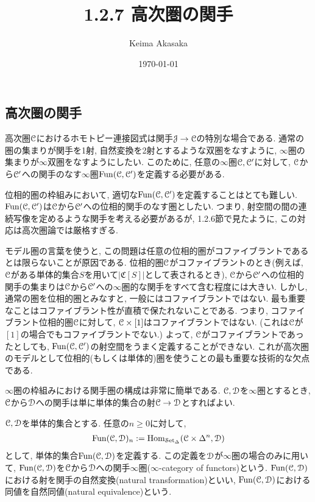 \documentclass[uplatex, a4paper, 14Q, dvipdfmx]{jsreport}
\title{1.2.7 高次圏の関手}
\author{Keima Akasaka}
\date{\today}
\begin{document}

\setcounter{chapter}{1}
\setcounter{section}{2} 
\setcounter{subsection}{6}   
\setcounter{subsubsection}{1}

\subsection{高次圏の関手}

高次圏$\mathcal{C}$におけるホモトピー連接図式は関手$\mathcal{J} \to \mathcal{C}$の特別な場合である. 
通常の圏の集まりが関手を1射, 自然変換を2射とするような双圏をなすように, $\infty$圏の集まりが$\infty$双圏をなすようにしたい. 
このために, 任意の$\infty$圏$\mathcal{C},\mathcal{C}'$に対して, $\mathcal{C}$から$\mathcal{C}'$への関手のなす$\infty$圏$\mathrm{Fun}(\mathcal{C},\mathcal{C}')$を定義する必要がある. 

位相的圏の枠組みにおいて, 適切な$\mathrm{Fun}(\mathcal{C},\mathcal{C}')$を定義することはとても難しい. 
$\mathrm{Fun}(\mathcal{C},\mathcal{C}')$は$\mathcal{C}$から$\mathcal{C}'$への位相的関手のなす圏としたい.
つまり, 射空間の間の連続写像を定めるような関手を考える必要があるが, 1.2.6節で見たように, この対応は高次圏論では厳格すぎる. 

\begin{remark} \label{rem.1.2.7.1}
  モデル圏の言葉を使うと, この問題は任意の位相的圏がコファイブラントであるとは限らないことが原因である.
  位相的圏$\mathcal{C}$がコファイブラントのとき(例えば, $\mathcal{C}$がある単体的集合$S$を用いて$|\mathfrak{C}[S]|$として表されるとき), $\mathcal{C}$から$\mathcal{C}'$への位相的関手の集まりは$\mathcal{C}$から$\mathcal{C}'$への$\infty$圏的な関手をすべて含む程度には大きい.
  しかし, 通常の圏を位相的圏とみなすと, 一般にはコファイブラントではない.
  最も重要なことはコファイブラント性が直積で保たれないことである. 
  つまり, コファイブラント位相的圏$\mathcal{C}$に対して, $\mathcal{C} \times [1]$はコファイブラントではない. (これは$\mathcal{C}$が$[1]$の場合でもコファイブラントでない.)
  よって, $\mathcal{C}$がコファイブラントであったとしても, $\mathrm{Fun}(\mathcal{C},\mathcal{C}')$の射空間をうまく定義することができない.
  これが高次圏のモデルとして位相的(もしくは単体的)圏を使うことの最も重要な技術的な欠点である. 
\end{remark}

$\infty$圏の枠組みにおける関手圏の構成は非常に簡単である. 
$\mathcal{C},\mathcal{D}$を$\infty$圏とするとき, $\mathcal{C}$から$\mathcal{D}$への関手は単に単体的集合の射$\mathcal{C} \to \mathcal{D}$とすればよい. 

\begin{notation}[関手$\infty$圏] \label{nota.1.2.7.2}
  $\mathcal{C},\mathcal{D}$を単体的集合とする. 
  任意の$n \geq 0$に対して, 
  \begin{align*}
    \mathrm{Fun}(\mathcal{C},\mathcal{D})_n := \mathrm{Hom}_{\mathcal{S}\mathrm{et}_{\Delta}}(\mathcal{C} \times \Delta^n, \mathcal{D})
  \end{align*}
  として, 単体的集合$\mathrm{Fun}(\mathcal{C},\mathcal{D})$を定義する. 
  この定義を$\mathcal{D}$が$\infty$圏の場合のみに用いて, $\mathrm{Fun}(\mathcal{C},\mathcal{D})$を$\mathcal{C}$から$\mathcal{D}$への関手$\infty$圏($\infty$-category of functors)という. 
  $\mathrm{Fun}(\mathcal{C},\mathcal{D})$における射を関手の自然変換(natural transformation)といい, $\mathrm{Fun}(\mathcal{C},\mathcal{D})$における同値を自然同値(natural equivalence)という. 
\end{notation}
\end{document}
